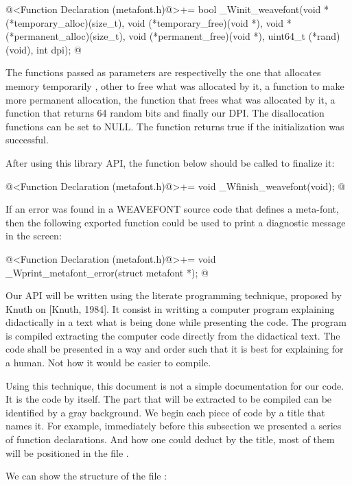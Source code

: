 \iniciocodigo
@<Function Declaration (metafont.h)@>+=
bool _Winit_weavefont(void *(*temporary_alloc)(size_t),
                     void (*temporary_free)(void *),
                     void *(*permanent_alloc)(size_t),
                     void (*permanent_free)(void *),
                     uint64_t (*rand)(void), int dpi);
@
\fimcodigo

The functions passed as parameters are respectivelly the one that
allocates memory temporarily , other to free what was allocated by it,
a function to make more permanent allocation, the function that frees
what was allocated by it, a function that returns 64 random bits and
finally our DPI. The disallocation functions can be set to NULL. The
function returns true if the initialization was successful.

After using this library API, the function below should be called to
finalize it:

\iniciocodigo
@<Function Declaration (metafont.h)@>+=
void _Wfinish_weavefont(void);
@
\fimcodigo

If an error was found in a WEAVEFONT source code that defines a
meta-font, then the following exported function could be used to print
a diagnostic message in the screen:

\iniciocodigo
@<Function Declaration (metafont.h)@>+=
void _Wprint_metafont_error(struct metafont *);
@
\fimcodigo



Our API will be written using the literate programming technique,
proposed by Knuth on [Knuth, 1984]. It consist in writting a computer
program explaining didactically in a text what is being done while
presenting the code. The program is compiled extracting the computer
code directly from the didactical text. The code shall be presented in
a way and order such that it is best for explaining for a human. Not
how it would be easier to compile.

Using this technique, this document is not a simple documentation for
our code. It is the code by itself. The part that will be extracted to
be compiled can be identified by a gray background. We begin each
piece of code by a title that names it. For example, immediately
before this subsection we presented a series of function
declarations. And how one could deduct by the title, most of them will
be positioned in the file .

We can show the structure of the file :

